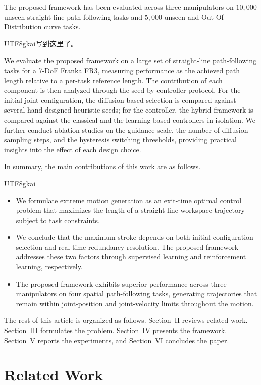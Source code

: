 \documentclass[journal, twoside]{IEEEtran}
\newcommand{\xinyi}[1]{{\color{darkorange}\begin{CJK*}{UTF8}{gkai}#1\end{CJK*}}}
\begin{document}
The proposed framework has been evaluated across three manipulators on $10{,}000$ unseen straight-line path-following tasks and $5{,}000$ unseen and Out-Of-Distribution curve tasks.\xinyi{写到这里了。}

We evaluate the proposed framework on a large set of straight-line path-following tasks for a 7-DoF Franka FR3, measuring performance as the achieved path length relative to a per-task reference length. The contribution of each component is then analyzed through the seed-by-controller protocol. For the initial joint configuration, the diffusion-based selection is compared against several hand-designed heuristic seeds; for the controller, the hybrid framework is compared against the classical and the learning-based controllers in isolation. We further conduct ablation studies on the guidance scale, the number of diffusion sampling steps, and the hysteresis switching thresholds, providing practical insights into the effect of each design choice.

In summary, the main contributions of this work are as follows.

\xinyi{
\begin{itemize}
\item We formulate extreme motion generation as an exit-time optimal control problem that maximizes the length of a straight-line workspace trajectory subject to task constraints.

\item We conclude that the maximum stroke depends on both initial configuration selection and real-time redundancy resolution. The proposed framework addresses these two factors through supervised learning and reinforcement learning, respectively.

\item The proposed framework exhibits superior performance across three manipulators on four spatial path-following tasks, generating trajectories that remain within joint-position and joint-velocity limits throughout the motion.
\end{itemize}
}

The rest of this article is organized as follows. Section~II reviews related work. Section~III formulates the problem. Section~IV presents the framework. Section~V reports the experiments, and Section~VI concludes the paper.

\section{Related Work}
\end{document}

